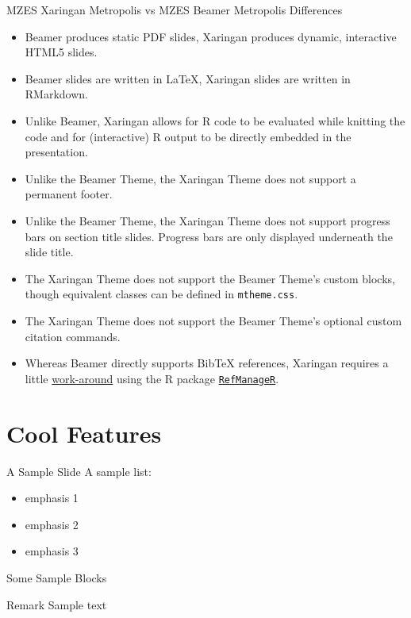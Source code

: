 \documentclass[10pt, aspectratio=169]{beamer}
\newcommand{\cemph}[1]{\textcolor{mzescyan}{#1}}
\begin{document}
{		\begin{frame}{MZES Xaringan Metropolis vs MZES Beamer Metropolis}
	\small
	\cemph{Differences}
		\begin{itemize}
			\item Beamer produces static PDF slides, Xaringan produces dynamic, interactive HTML5 slides.
			\item Beamer slides are written in LaTeX, Xaringan slides are written in RMarkdown.
			\item Unlike Beamer, Xaringan allows for R code to be evaluated while knitting the code and for (interactive) R output to be directly embedded in the presentation.
			\item Unlike the Beamer Theme, the Xaringan Theme does not support a permanent footer.
			\item Unlike the Beamer Theme, the Xaringan Theme does not support progress bars on section title slides. Progress bars are only displayed underneath the slide title.
			\item The Xaringan Theme does not support the Beamer Theme's custom blocks, though equivalent classes can be defined in \texttt{mtheme.css}.
			\item The Xaringan Theme does not support the Beamer Theme's optional custom citation commands.
			\item Whereas Beamer directly supports BibTeX references, Xaringan requires a little \href{https://github.com/yihui/xaringan/wiki/Bibliography-and-citations}{work-around} using the R package \href{https://cran.r-project.org/web/packages/RefManageR/index.html}{\texttt{RefManageR}}.
		\end{itemize}
	\end{frame}
	
	\section{Cool Features}
	\begin{frame}{A Sample Slide}
		A sample list:
		\begin{itemize}
			\item \textcolor{mzesgold}{emphasis 1}
			\item \textcolor{mzescyan}{emphasis 2}
			\item \textcolor{mzesdarkgold}{emphasis 3}
		\end{itemize}
	\end{frame}
	
	\begin{frame}{Some Sample Blocks}
		\begin{block}{Remark}
			Sample text
		\end{block}
		

\end{frame}}
\end{document}
